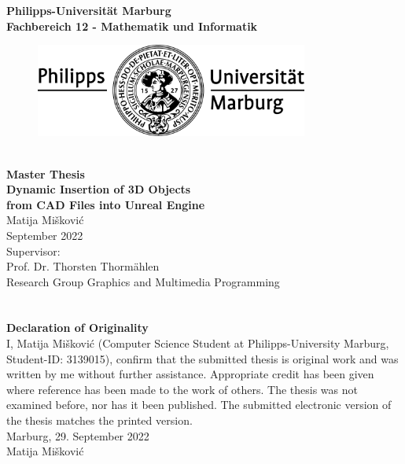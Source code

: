 \documentclass[a4paper, 11pt,bibtotoc,abstracton]{scrreprt}
\begin{document}
\begin{titlepage}
\begin{center}
{\huge \textbf{Philipps-Universität Marburg}}\\[0.5cm]
\textbf{Fachbereich 12 - Mathematik und Informatik}\\[0.5cm]

\begin{figure}[h]
	\centering
		\includegraphics[width=0.8\textwidth]{fig/unilogo.pdf}
\end{figure}

{\huge \textbf{{\large \\[1cm]Master Thesis}}}
\\[1cm]

{\Huge \textbf{Dynamic Insertion of 3D Objects\\ from CAD Files into Unreal Engine}}
\\[1cm]

{\large  Matija Mišković}\\
{\large September 2022}\\[3cm]

{\large
Supervisor:\\ Prof. Dr. Thorsten Thormählen\\[1cm]
Research Group Graphics and Multimedia Programming}

\end{center}
\end{titlepage}
\newpage
\thispagestyle{empty}
\section*{}
\newpage
\thispagestyle{empty}
\vspace*{7cm}
\textbf{\Large {Declaration of Originality}}\\[0.5cm]
I,  Matija Mišković (Computer Science Student at Philipps-University Marburg, Student-ID:
3139015), confirm that the submitted thesis is original work and was written by me without further assistance. Appropriate credit has been given where reference has been made to the work of others.
The thesis was not examined before, nor has it been published. The submitted electronic version of
the thesis matches the printed version.\\[1cm]
Marburg, 29. September 2022\\[0.5cm]
 Matija Mišković
\newpage
\shipout\null


  
\end{document}
